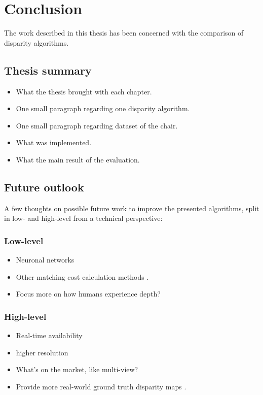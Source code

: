 \chapter{Conclusion}
\label{chap:conclusion}

The work described in this thesis has been concerned with the comparison of disparity algorithms.

\section{Thesis summary}

\begin{itemize}
  \item What the thesis brought with each chapter.
  \item One small paragraph regarding one disparity algorithm.
  \item One small paragraph regarding dataset of the chair.
  \item What was implemented.
  \item What the main result of the evaluation.
\end{itemize}

\section{Future outlook}

A few thoughts on possible future work to improve the presented algorithms, split in low- and high-level from a technical perspective:

\subsection*{Low-level}

\begin{itemize}
  \item Neuronal networks \citep{olshausen1996emergence}
  \item Other matching cost calculation methods \citep{hermann2010gradient}.
  \item Focus more on how humans experience depth? \citep{deangelis1995neuronal}
\end{itemize}

\subsection*{High-level}

\begin{itemize}
  \item Real-time availability
  \item higher resolution
  \item What's on the market, like multi-view?
  \item Provide more real-world ground truth disparity maps \citep{kondermann2015stereo, Geiger2011IV}.
\end{itemize}
